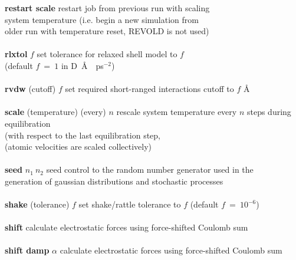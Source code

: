 \begin{tabbing}
\> {\bf restart scale}                          \> restart job from previous run with scaling \\
\>                                              \> system temperature (i.e. begin a new simulation from \\
\>                                              \> older run with temperature reset, REVOLD is not used) \\
\>                                              \> \\
\> {\bf rlxtol} $f$                             \> set tolerance for relaxed shell model to $f$ \\
\>                                              \> (default $f~=~1$ in D~\AA~~ps$^{-2}$) \\
\>                                              \> \\
\> {\bf rvdw} (cutoff) $f$                      \> set required short-ranged interactions cutoff to $f$ \AA \\
\>                                              \> \\
\> {\bf scale} (temperature) (every) $n$        \> rescale system temperature every $n$ steps during equilibration \\
\>                                              \> (with respect to the last equilibration step, \\
\>                                              \> (atomic velocities are scaled collectively) \\
\>                                              \> \\
\> {\bf seed} $n_{1}~n_{2}$                     \> seed control to the random number generator used in the \\
\>                                              \> generation of gaussian distributions and stochastic processes \\
\>                                              \> \\
\> {\bf shake} (tolerance) $f$                  \> set shake/rattle tolerance to $f$ (default $f~=~10^{-6}$) \\
\>                                              \> \\
\> {\bf shift}                                  \> calculate electrostatic forces using force-shifted Coulomb sum \\
\>                                              \> \\
\> {\bf shift damp} $\alpha$                    \> calculate electrostatic forces using force-shifted Coulomb sum \\

\end{tabbing}
